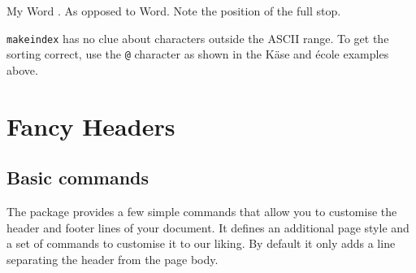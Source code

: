 \begin{chktexignore}  
\begin{example}
My Word . As opposed
to Word. Note the
position of the full stop.
\end{example}
\end{chktexignore}

\texttt{makeindex} has no clue about characters outside the ASCII range. To
get the sorting correct, use the \verb|@| character as shown in the K\"ase
and \'ecole examples above.

\section{Fancy Headers}\label{sec:fancy}

\subsection{Basic commands}

The  package provides a few simple commands that allow you to
customise the header and footer lines of your document. It defines an
additional page style  and a set of commands to customise it to our liking. By
default it only adds a line separating the header from the page body.

